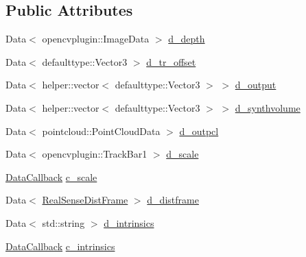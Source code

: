 \subsection*{Public Attributes}
\begin{DoxyCompactItemize}
\item 
Data$<$ opencvplugin\+::\+Image\+Data $>$ \hyperlink{classsofa_1_1rgbdtracking_1_1_real_sense_abstract_deprojector_ae7f5594d19b61c9fb590c52a691640e7}{d\+\_\+depth}
\item 
Data$<$ defaulttype\+::\+Vector3 $>$ \hyperlink{classsofa_1_1rgbdtracking_1_1_real_sense_abstract_deprojector_a2f887b81e72511844e1dccc0bb8f9a2c}{d\+\_\+tr\+\_\+offset}
\item 
Data$<$ helper\+::vector$<$ defaulttype\+::\+Vector3 $>$ $>$ \hyperlink{classsofa_1_1rgbdtracking_1_1_real_sense_abstract_deprojector_a3ef009292c2c22613c774b73b327f366}{d\+\_\+output}
\item 
Data$<$ helper\+::vector$<$ defaulttype\+::\+Vector3 $>$ $>$ \hyperlink{classsofa_1_1rgbdtracking_1_1_real_sense_abstract_deprojector_abe1761bdd6106f7ee1b288bf3846fa71}{d\+\_\+synthvolume}
\item 
Data$<$ pointcloud\+::\+Point\+Cloud\+Data $>$ \hyperlink{classsofa_1_1rgbdtracking_1_1_real_sense_abstract_deprojector_a93bfad0013b406e433cf07e342cdc4b5}{d\+\_\+outpcl}
\item 
Data$<$ opencvplugin\+::\+Track\+Bar1 $>$ \hyperlink{classsofa_1_1rgbdtracking_1_1_real_sense_abstract_deprojector_a01e0cd824f7c1e046f9b8a4b0fb5b8ba}{d\+\_\+scale}
\item 
\hyperlink{namespacesofa_1_1rgbdtracking_a00834a9204a667746fef9a402ccbfb55}{Data\+Callback} \hyperlink{classsofa_1_1rgbdtracking_1_1_real_sense_abstract_deprojector_ac692621d9153db98d722796883b1cb88}{c\+\_\+scale}
\item 
Data$<$ \hyperlink{classsofa_1_1rgbdtracking_1_1_real_sense_dist_frame}{Real\+Sense\+Dist\+Frame} $>$ \hyperlink{classsofa_1_1rgbdtracking_1_1_real_sense_abstract_deprojector_a06f9d1a842d19213587304d7e1889b8d}{d\+\_\+distframe}
\item 
Data$<$ std\+::string $>$ \hyperlink{classsofa_1_1rgbdtracking_1_1_real_sense_abstract_deprojector_a8208172bcb64e5ffa7e3ef36182d9fff}{d\+\_\+intrinsics}
\item 
\hyperlink{namespacesofa_1_1rgbdtracking_a00834a9204a667746fef9a402ccbfb55}{Data\+Callback} \hyperlink{classsofa_1_1rgbdtracking_1_1_real_sense_abstract_deprojector_a1194f7c58abfef73ea623a3bd18b09c7}{c\+\_\+intrinsics}
\item 

\end{DoxyCompactItemize}
